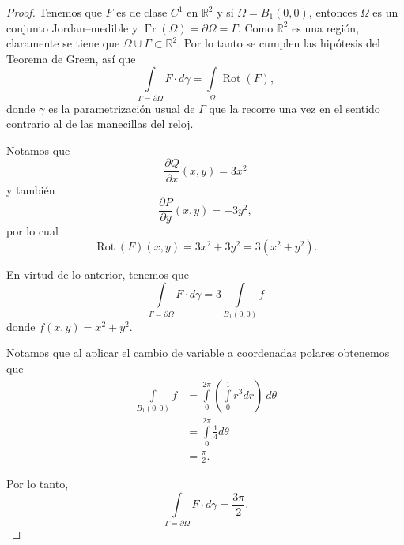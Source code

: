 \documentclass[
]{krantz}
\theoremstyle{definition}
\theoremstyle{definition}
\theoremstyle{definition}
\theoremstyle{definition}
\theoremstyle{remark}
\begin{document}
\begin{proof}
{}Tenemos que \(F\) es de clase \(C^1\) en \(\mathbb{R}^2\) y si \(\Omega = B_1(0,0)\), entonces \(\Omega\) es un conjunto Jordan--medible y \(\mathop{\mathrm{Fr}}\left(\Omega\right) = \partial \Omega = \Gamma\). Como \(\mathbb{R}^2\) es una región, claramente se tiene que \(\Omega \cup \Gamma\subset \mathbb{R}^2\). Por lo tanto se cumplen las hipótesis del Teorema de Green, así que
\begin{equation*}
            \displaystyle\int\limits_{\Gamma=\partial \Omega} F \cdot d\gamma = \int\limits_{\Omega} \mathop{\mathrm{Rot}}\left( F \right), 
\end{equation*}
donde \(\gamma\) es la parametrización usual de \(\Gamma\) que la recorre una vez en el sentido contrario al de las manecillas del reloj.

Notamos que
\begin{equation*}
            \frac{\partial Q}{\partial x}(x,y) = 3x^2
\end{equation*}
y también
\begin{equation*}
            \frac{\partial P}{\partial y}(x,y) = -3y^2,
\end{equation*}
por lo cual
\begin{equation*}
            \mathop{\mathrm{Rot}}(F)(x,y) = 3x^2 + 3y^2 = 3(x^2 + y^2). 
\end{equation*}

En virtud de lo anterior, tenemos que
\begin{equation*}
            \displaystyle\int\limits_{\Gamma=\partial \Omega} F \cdot d\gamma = 3\int\limits_{B_1(0,0)} f
        \end{equation*}
donde \(f(x,y) = x^2+y^2\).

Notamos que al aplicar el cambio de variable a coordenadas polares obtenemos que
\begin{align*}
            \int\limits_{B_1(0,0)} f & = \int\limits_{0}^{2\pi}\left(\int\limits_{0}^{1} r^3 dr\right)\ d\theta \\
            & = \int\limits_{0}^{2\pi} \frac{1}{4} d\theta \\
            & = \frac{\pi}{2}.
        \end{align*}

Por lo tanto,
\begin{equation*}
            \displaystyle\int\limits_{\Gamma=\partial \Omega} F \cdot d\gamma = \frac{3\pi}{2}.
        \end{equation*}
\end{proof}
\end{document}
